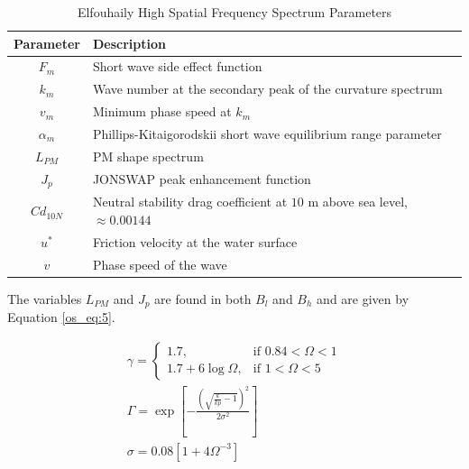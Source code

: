 \begin{table}[ht]
  \begin{center}
      \renewcommand{\baselinestretch}{1} \small\normalsize
  \begin{quote}
    \caption[Elfouhaily High Spatial Frequency Spectrum Parameters]{Elfouhaily High Spatial Frequency Spectrum Parameters\label{os_tab:2}}
  \end{quote}
  \begin{supertabular} {|c | l |}
    \hline
  \bf{Parameter} & \bf{Description} \\ \hline
  $F_m$ & Short wave side effect function \\ \hline
  $k_m$ &  Wave number at the secondary peak of the curvature spectrum \\ \hline
  $v_m$ &  Minimum phase speed at $k_m$ \\ \hline
  $\alpha_m$ & Phillips-Kitaigorodskii short wave equilibrium range parameter \\ \hline
  $L_{PM}$ & PM shape spectrum \\ \hline
  $J_p$ & JONSWAP peak enhancement function \\ \hline
  $Cd_{10N}$ & Neutral stability drag coefficient at $10$ m above sea level, $\approx 0.00144$ \\ \hline
  $u^*$ & Friction velocity at the water surface \\ \hline
  $v$ & Phase speed of the wave \\ \hline
\end{supertabular}
\end{center}
\end{table}
\renewcommand{\baselinestretch}{2} \small\normalsize

The variables $L_{PM}$ and $J_p$ are found in both $B_l$ and $B_h$ and are given by Equation \ref{os_eq:5}.

\begin{equation}
\begin{gathered}
  \label{os_eq:5}
    \gamma = \begin{cases}
    1.7,& \text{if } 0.84 < \Omega < 1\\
    1.7 + 6\log{\Omega}, & \text{if } 1 < \Omega < 5
  \end{cases} \\
  \Gamma = \exp{\left[- \frac{\left(\sqrt{\frac{k}{kp} - 1} \right)^2}{2\sigma^2} \right]} \\
  \sigma = 0.08\left[1 + 4\Omega^{-3} \right] \\
\end{gathered}
\end{equation}
\renewcommand{\baselinestretch}{2} \small\normalsize

